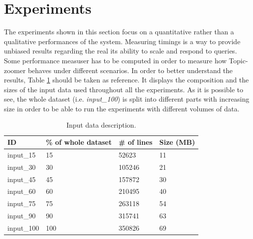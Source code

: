 \documentclass{sig-alternate-05-2015}
\begin{document}
\section{Experiments}\label{experiments}
The experiments shown in this section focus on a quantitative rather than a qualitative performances of the system. Measuring timings is a way to provide unbiased results regarding the real its ability to scale and respond to queries.\\
Some performance measuser has to be computed in order to measure how Topic-zoomer behaves under different scenarios. In order to better understand the results, Table \ref{datasets} should be taken as reference. It displays the composition and the sizes of the input data used throughout all the experiments. As it is possible to see, the whole dataset (i.e. \emph{input\_100}) is split into different parts with increasing size in order to be able to run the experiments with different volumes of data.

\begin{table}[]
    \centering
    \caption{Input data description.}
    \label{datasets}
    \begin{tabular}{llll}
    \hline
    ID         & \% of whole dataset & \# of lines & Size (MB) \\
    \hline
    input\_15  & 15                  & 52623       & 11        \\
    input\_30  & 30                  & 105246      & 21        \\
    input\_45  & 45                  & 157872      & 30        \\
    input\_60  & 60                  & 210495      & 40        \\
    input\_75  & 75                  & 263118      & 54        \\
    input\_90  & 90                  & 315741      & 63        \\
    input\_100 & 100                 & 350826      & 69       
    \end{tabular}
\end{table}
\end{document}
